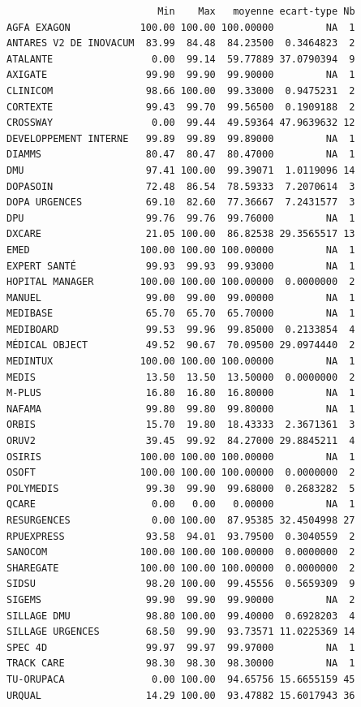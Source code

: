 \documentclass[]{article}
\begin{document}
\begin{verbatim}
                          Min    Max   moyenne ecart-type Nb
AGFA EXAGON            100.00 100.00 100.00000         NA  1
ANTARES V2 DE INOVACUM  83.99  84.48  84.23500  0.3464823  2
ATALANTE                 0.00  99.14  59.77889 37.0790394  9
AXIGATE                 99.90  99.90  99.90000         NA  1
CLINICOM                98.66 100.00  99.33000  0.9475231  2
CORTEXTE                99.43  99.70  99.56500  0.1909188  2
CROSSWAY                 0.00  99.44  49.59364 47.9639632 12
DEVELOPPEMENT INTERNE   99.89  99.89  99.89000         NA  1
DIAMMS                  80.47  80.47  80.47000         NA  1
DMU                     97.41 100.00  99.39071  1.0119096 14
DOPASOIN                72.48  86.54  78.59333  7.2070614  3
DOPA URGENCES           69.10  82.60  77.36667  7.2431577  3
DPU                     99.76  99.76  99.76000         NA  1
DXCARE                  21.05 100.00  86.82538 29.3565517 13
EMED                   100.00 100.00 100.00000         NA  1
EXPERT SANTÉ            99.93  99.93  99.93000         NA  1
HOPITAL MANAGER        100.00 100.00 100.00000  0.0000000  2
MANUEL                  99.00  99.00  99.00000         NA  1
MEDIBASE                65.70  65.70  65.70000         NA  1
MEDIBOARD               99.53  99.96  99.85000  0.2133854  4
MÉDICAL OBJECT          49.52  90.67  70.09500 29.0974440  2
MEDINTUX               100.00 100.00 100.00000         NA  1
MEDIS                   13.50  13.50  13.50000  0.0000000  2
M-PLUS                  16.80  16.80  16.80000         NA  1
NAFAMA                  99.80  99.80  99.80000         NA  1
ORBIS                   15.70  19.80  18.43333  2.3671361  3
ORUV2                   39.45  99.92  84.27000 29.8845211  4
OSIRIS                 100.00 100.00 100.00000         NA  1
OSOFT                  100.00 100.00 100.00000  0.0000000  2
POLYMEDIS               99.30  99.90  99.68000  0.2683282  5
QCARE                    0.00   0.00   0.00000         NA  1
RESURGENCES              0.00 100.00  87.95385 32.4504998 27
RPUEXPRESS              93.58  94.01  93.79500  0.3040559  2
SANOCOM                100.00 100.00 100.00000  0.0000000  2
SHAREGATE              100.00 100.00 100.00000  0.0000000  2
SIDSU                   98.20 100.00  99.45556  0.5659309  9
SIGEMS                  99.90  99.90  99.90000         NA  2
SILLAGE DMU             98.80 100.00  99.40000  0.6928203  4
SILLAGE URGENCES        68.50  99.90  93.73571 11.0225369 14
SPEC 4D                 99.97  99.97  99.97000         NA  1
TRACK CARE              98.30  98.30  98.30000         NA  1
TU-ORUPACA               0.00 100.00  94.65756 15.6655159 45
URQUAL                  14.29 100.00  93.47882 15.6017943 36
\end{verbatim}
\end{document}
